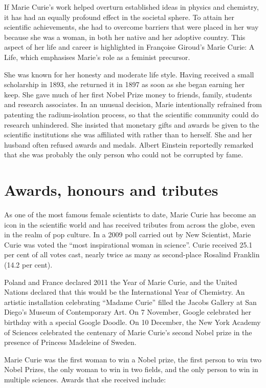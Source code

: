 \documentclass[12pt,a4paper]{article}
\begin{document}
If Marie Curie's work helped overturn established ideas in physics and chemistry, it has had an equally profound effect in the societal sphere. To attain her scientific achievements, she had to overcome barriers that were placed in her way because she was a woman, in both her native and her adoptive country. This aspect of her life and career is highlighted in Fran\c{c}oise Giroud's Marie Curie: A Life, which emphasises Marie's role as a feminist precursor.

She was known for her honesty and moderate life style. Having received a small scholarship in 1893, she returned it in 1897 as soon as she began earning her keep. She gave much of her first Nobel Prize money to friends, family, students and research associates. In an unusual decision, Marie intentionally refrained from patenting the radium-isolation process, so that the scientific community could do research unhindered. She insisted that monetary gifts and awards be given to the scientific institutions she was affiliated with rather than to herself. She and her husband often refused awards and medals. Albert Einstein reportedly remarked that she was probably the only person who could not be corrupted by fame.

\section{Awards, honours and tributes}

As one of the most famous female scientists to date, Marie Curie has become an icon in the scientific world and has received tributes from across the globe, even in the realm of pop culture. In a 2009 poll carried out by New Scientist, Marie Curie was voted the ``most inspirational woman in science''. Curie received 25.1 per cent of all votes cast, nearly twice as many as second-place Rosalind Franklin (14.2 per cent).

Poland and France declared 2011 the Year of Marie Curie, and the United Nations declared that this would be the International Year of Chemistry. An artistic installation celebrating ``Madame Curie'' filled the Jacobs Gallery at San Diego's Museum of Contemporary Art. On 7 November, Google celebrated her birthday with a special Google Doodle. On 10 December, the New York Academy of Sciences celebrated the centenary of Marie Curie's second Nobel prize in the presence of Princess Madeleine of Sweden.

Marie Curie was the first woman to win a Nobel prize, the first person to win two Nobel Prizes, the only woman to win in two fields, and the only person to win in multiple sciences. Awards that she received include:
\end{document}
